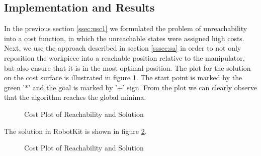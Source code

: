 \subsection{Implementation and Results}
In the previous section \ref{ssec:usc1} we formulated the problem of unreachability into a cost function, in which the unreachable states were assigned high costs. Next, we use the approach described in section \ref{sssec:sa} in order to not only reposition the workpiece into a reachable position relative to the manipulator, but also ensure that it is in the most optimal position. The plot for the solution on the cost surface is illustrated in figure \ref{fig:rc4}. The start point is marked by the green '*' and the goal is marked by '+' sign. From the plot we can clearly observe that the algorithm reaches the global minima. 
\begin{figure}[!ht] %
	\centering
	\caption{Cost Plot of Reachability and Solution }
	\label{fig:rc4}
\end{figure}
The solution in RobotKit is shown in figure \ref{fig:rc5}.
\begin{figure}[!ht] %
	\centering
	\caption{Cost Plot of Reachability and Solution }
	\label{fig:rc5}
\end{figure}
\clearpage



